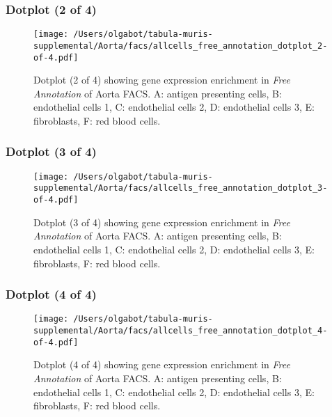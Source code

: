 \clearpage
\subsubsection{Dotplot (2 of 4)}
\begin{figure}[h]
\centering
\texttt{[image: /Users/olgabot/tabula-muris-supplemental/Aorta/facs/allcells\_free\_annotation\_dotplot\_2-of-4.pdf]}

\caption{ Dotplot (2 of 4)  showing gene expression enrichment in \emph{Free Annotation} of Aorta FACS. A: antigen presenting cells, B: endothelial cells 1, C: endothelial cells 2, D: endothelial cells 3, E: fibroblasts, F: red blood cells.}
\end{figure}


\clearpage
\subsubsection{Dotplot (3 of 4)}
\begin{figure}[h]
\centering
\texttt{[image: /Users/olgabot/tabula-muris-supplemental/Aorta/facs/allcells\_free\_annotation\_dotplot\_3-of-4.pdf]}

\caption{ Dotplot (3 of 4)  showing gene expression enrichment in \emph{Free Annotation} of Aorta FACS. A: antigen presenting cells, B: endothelial cells 1, C: endothelial cells 2, D: endothelial cells 3, E: fibroblasts, F: red blood cells.}
\end{figure}


\clearpage
\subsubsection{Dotplot (4 of 4)}
\begin{figure}[h]
\centering
\texttt{[image: /Users/olgabot/tabula-muris-supplemental/Aorta/facs/allcells\_free\_annotation\_dotplot\_4-of-4.pdf]}

\caption{ Dotplot (4 of 4)  showing gene expression enrichment in \emph{Free Annotation} of Aorta FACS. A: antigen presenting cells, B: endothelial cells 1, C: endothelial cells 2, D: endothelial cells 3, E: fibroblasts, F: red blood cells.}
\end{figure}

